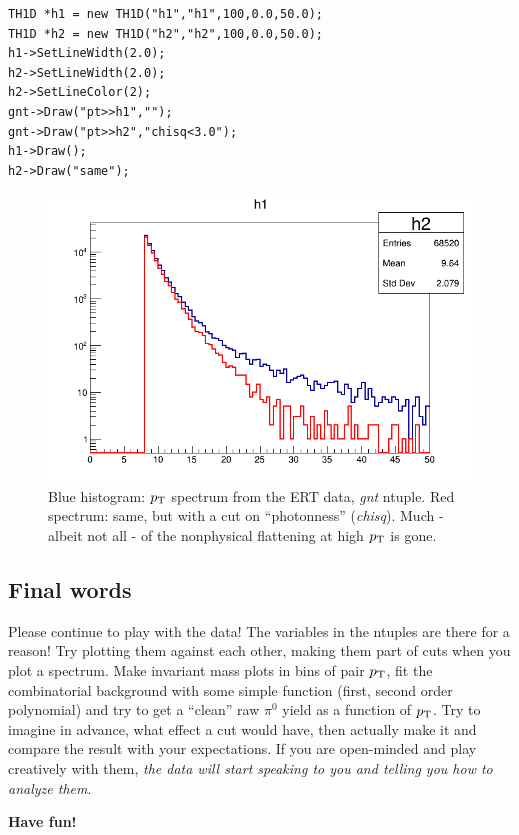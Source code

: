 \documentclass[pdftex,12pt,letter]{article}
\newcommand{\piz}{\mbox{$\pi^0$}\xspace}
\newcommand{\pt}{\mbox{$p_{\rm T}$}\xspace}
\begin{document}
\begin{lstlisting}
TH1D *h1 = new TH1D("h1","h1",100,0.0,50.0);
TH1D *h2 = new TH1D("h2","h2",100,0.0,50.0);
h1->SetLineWidth(2.0);
h2->SetLineWidth(2.0);
h2->SetLineColor(2);
gnt->Draw("pt>>h1","");
gnt->Draw("pt>>h2","chisq<3.0");
h1->Draw();
h2->Draw("same");
\end{lstlisting}


\begin{center}
\begin{figure}[htbp]
  \includegraphics[width=0.5\linewidth]{figs/ertgntpt}
  \caption{Blue histogram: \pt spectrum from the ERT data, 
    {\it gnt} ntuple.  Red spectrum: same, but with a cut on
    ``photonness'' ({\it chisq}).  Much - albeit not all - of the
    nonphysical flattening at high \pt is gone.
  }
  \label{fig:ertgntpt}
\end{figure}
\end{center}
\subsection{Final words}
Please continue to play with the data!  The variables in the ntuples
are there for a reason!  Try plotting them against each other, making
them part of cuts when you plot a spectrum.  Make invariant mass plots
in bins of pair \pt, fit the combinatorial background with some simple
function (first, second order polynomial) and try to get a ``clean''
raw \piz yield as a function of \pt.  Try to imagine in advance, what
effect a cut would have, then actually make it and compare the result
with your expectations.  If you are open-minded and play creatively
with them, {\it the data will start speaking to you and telling you
how to analyze them}.

\vspace{0.2in}

\noindent
{\bf Have fun!}
\end{document}

